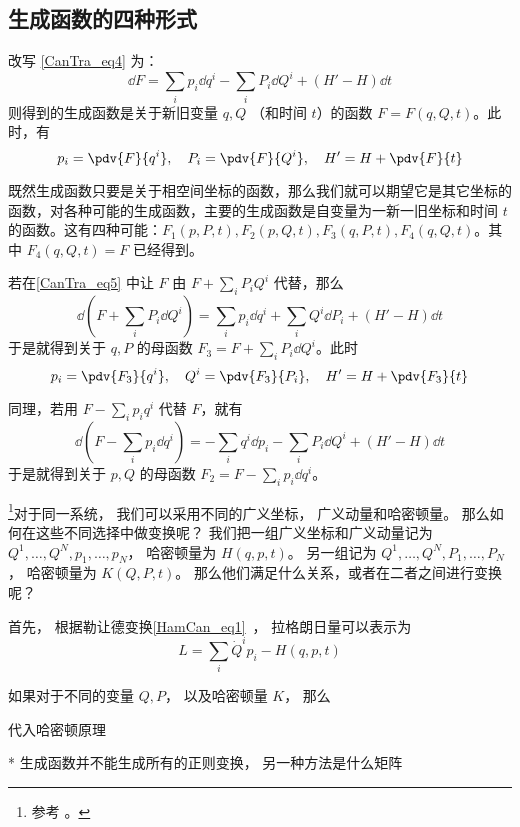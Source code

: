 \subsection{生成函数的四种形式}
改写 \autoref{CanTra_eq4} 为：
\begin{equation}\label{CanTra_eq5}
\dd F=\sum_ip_i\dd q^i-\sum_iP_i\dd Q^i+(H'-H)\dd t
\end{equation}
则得到的生成函数是关于新旧变量 $q,Q$ （和时间 $t$）的函数 $F=F(q,Q,t)$。此时，有
\begin{equation}
p_i=\pdv{F}{q^i},\quad P_i=\pdv{F}{Q^i},\quad H'=H+\pdv{F}{t}
\end{equation}

既然生成函数只要是关于相空间坐标的函数，那么我们就可以期望它是其它坐标的函数，对各种可能的生成函数，主要的生成函数是自变量为一新一旧坐标和时间 $t$ 的函数。这有四种可能：$F_1(p,P,t),F_2(p,Q,t),F_3(q,P,t),F_4(q,Q,t)$。其中 $F_4(q,Q,t)=F$ 已经得到。

若在\autoref{CanTra_eq5} 中让 $F$ 由 $F+\sum_iP_i Q^i$ 代替，那么
\begin{equation}
\dd (F+\sum_iP_i\dd Q^i)=\sum_i p_i\dd q^i+\sum_i Q^i\dd P_i+(H'-H)\dd t
\end{equation}
于是就得到关于 $q,P$ 的母函数 $F_3=F+\sum_iP_i\dd Q^i$。此时
\begin{equation}
p_i=\pdv{F_3}{q^i},\quad Q^i=\pdv{F_3}{P_i},\quad H'=H+\pdv{F_3}{t}
\end{equation}


同理，若用 $F-\sum_ip_iq^i$ 代替 $F$，就有
\begin{equation}
\dd (F-\sum_ip_i\dd q^i)=-\sum_i q^i\dd p_i-\sum_i P_i\dd Q^i+(H'-H)\dd t
\end{equation}
于是就得到关于 $p,Q$ 的母函数 $F_2=F-\sum_ip_i\dd q^i$。


\footnote{参考 \cite{Goldstein}。}对于同一系统， 我们可以采用不同的广义坐标， 广义动量和哈密顿量。 那么如何在这些不同选择中做变换呢？ 我们把一组广义坐标和广义动量记为 $Q^1,\dots, Q^N, p_1, \dots, p_N$， 哈密顿量为 $H(q, p, t)$。 另一组记为 $Q^1,\dots, Q^N, P_1, \dots, P_N$， 哈密顿量为 $K(Q, P, t)$。 那么他们满足什么关系，或者在二者之间进行变换呢？

首先， 根据勒让德变换\autoref{HamCan_eq1}~， 拉格朗日量可以表示为
\begin{equation}
L = \sum_i \dot Q^i p_i - H(q, p, t)
\end{equation}

如果对于不同的变量 $Q, P$， 以及哈密顿量 $K$， 那么

代入哈密顿原理

* 生成函数并不能生成所有的正则变换， 另一种方法是什么矩阵

